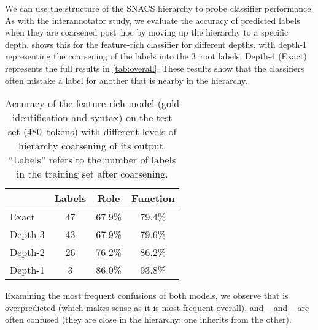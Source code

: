 \pdfoutput=1 \documentclass[11pt,a4paper]{article}
\begin{document}
We can use the structure of the SNACS hierarchy
to probe classifier performance. As with the interannotator study, we evaluate the
accuracy of predicted labels when they are coarsened post~hoc by moving up the
hierarchy to a specific depth. 
shows this for the feature-rich classifier for different
depths, with depth-1 representing the coarsening of the labels into
the 3~root labels. Depth-4 (Exact) represents the full results in \cref{tab:overall}. 
These results show that the classifiers often mistake a label for another that is nearby in the hierarchy. 
\begin{table}[t]\centering\small
\begin{tabular}{lccc}
        & Labels    & Role   & Function \\
\toprule
Exact   & 47        & 67.9\% & 79.4\%   \\
Depth-3 & 43        & 67.9\% & 79.6\%   \\
Depth-2 & 26        & 76.2\% & 86.2\%   \\
Depth-1 & 3         & 86.0\% & 93.8\%   \\
\end{tabular}
\caption{Accuracy of the feature-rich model (gold identification and syntax) on the test set (480~tokens) with different levels of hierarchy coarsening of its output.
``Labels'' refers to the number of labels in the training set after coarsening. 
}
\label{tab:coarsening-disambig}
\end{table}
Examining the most frequent confusions of both models, 
we observe that  is overpredicted (which makes sense as it is most frequent overall), and -- and
--  are often confused (they are close in the hierarchy: one inherits from the other).
\end{document}
